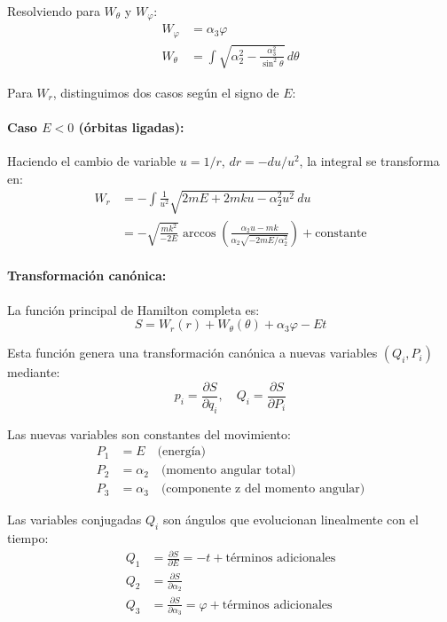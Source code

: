 \documentclass[12pt]{article}
\begin{document}
\begin{enumerate}
  Resolviendo para $W_\theta$ y $W_\varphi$:
  \begin{align}
  W_\varphi &= \alpha_3\varphi \\
  W_\theta &= \int\sqrt{\alpha_2^2 - \frac{\alpha_3^2}{\sin^2\theta}}\,d\theta
  \end{align}

  Para $W_r$, distinguimos dos casos según el signo de $E$:

  \paragraph{Caso $E < 0$ (órbitas ligadas):}
  Haciendo el cambio de variable $u = 1/r$, $dr = -du/u^2$, la integral se transforma en:
  \begin{align}
  W_r &= -\int\frac{1}{u^2}\sqrt{2mE + 2mku - \alpha_2^2u^2}\,du \\
  &= -\sqrt{\frac{mk^2}{-2E}}\arccos\left(\frac{\alpha_2u-mk}{\alpha_2\sqrt{-2mE/\alpha_2^2}}\right) + \text{constante}
  \end{align}

  \paragraph{Transformación canónica:}
  La función principal de Hamilton completa es:
  \[
  S = W_r(r) + W_\theta(\theta) + \alpha_3\varphi - Et
  \]

  Esta función genera una transformación canónica a nuevas variables $(Q_i,P_i)$ mediante:
  \[
  p_i = \frac{\partial S}{\partial q_i}, \quad Q_i = \frac{\partial S}{\partial P_i}
  \]

  Las nuevas variables son constantes del movimiento:
  \begin{align}
  P_1 &= E \quad \text{(energía)} \\
  P_2 &= \alpha_2 \quad \text{(momento angular total)} \\
  P_3 &= \alpha_3 \quad \text{(componente z del momento angular)}
  \end{align}

  Las variables conjugadas $Q_i$ son ángulos que evolucionan linealmente con el tiempo:
  \begin{align}
  Q_1 &= \frac{\partial S}{\partial E} = -t + \text{términos adicionales} \\
  Q_2 &= \frac{\partial S}{\partial \alpha_2} \\
  Q_3 &= \frac{\partial S}{\partial \alpha_3} = \varphi + \text{términos adicionales}
  \end{align}


\end{enumerate}
\end{document}
